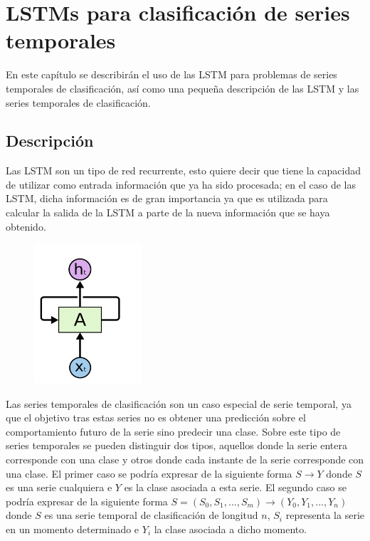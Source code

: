 \chapter{LSTMs para clasificación de series temporales}
En este capítulo se describirán el uso de las LSTM para problemas de series temporales de clasificación, así como una pequeña descripción de las LSTM y las series temporales de clasificación.
\section{Descripción}
Las LSTM son un tipo de red recurrente, esto quiere decir que tiene la capacidad de utilizar como entrada información que ya ha sido procesada; en el caso de las LSTM, dicha información es de gran importancia ya que es utilizada para calcular la salida de la LSTM a parte de la nueva información que se haya obtenido.\newline

\begin{figure}[h]
	\centering
	\includegraphics[width=40mm]{imagenes/lstm_basico.png}
	\label{fig:9}
\end{figure}
\verticalspace

Las series temporales de clasificación son un caso especial de serie temporal, ya que el objetivo tras estas series no es obtener una predicción sobre el comportamiento futuro de la serie sino predecir una clase. Sobre este tipo de series temporales se pueden distinguir dos tipos, aquellos donde la serie entera corresponde con una clase y otros donde cada instante de la serie corresponde con una clase. El primer caso se podría expresar de la siguiente forma $ S \rightarrow Y $ donde $S$  es una serie cualquiera e $Y$ es la clase asociada a esta serie. El segundo caso se podría expresar de la siguiente forma $ S = (S_0, S_1,..., S_m) \rightarrow (Y_0,Y_1,..., Y_n) $ donde $S$ es una serie temporal de clasificación de longitud $n$, $S_i$ representa la serie en un momento determinado e $Y_i$ la clase asociada a dicho momento.\newline

